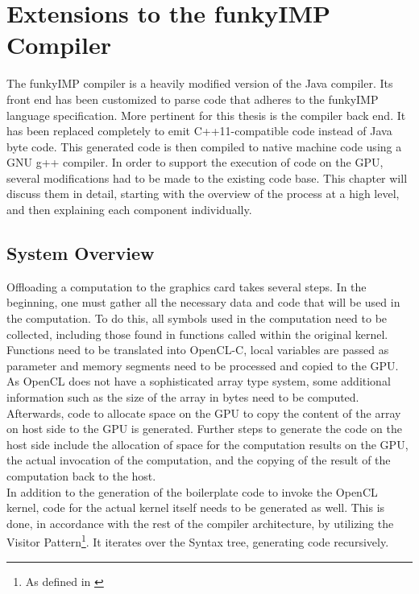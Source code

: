 
\chapter{Extensions to the funkyIMP Compiler}
\label{chap:compiler}
The funkyIMP compiler is a heavily modified version of the Java compiler. Its front end has been customized to parse code that adheres to the funkyIMP language specification. More pertinent for this thesis is the compiler back end. It has been replaced completely to emit C++11-compatible code instead of Java byte code. This generated code is then compiled to native machine code using a GNU g++ compiler. In order to support the execution of code on the GPU, several modifications had to be made to the existing code base. This chapter will discuss them in detail, starting with the overview of the process at a high level, and then explaining each component individually.



\section{System Overview}
\label{sect:compiler_overview}
Offloading a computation to the graphics card takes several steps. In the beginning, one must gather all the necessary data and code that will be used in the computation. To do this, all symbols used in the computation need to be collected, including those found in functions called within the original kernel. Functions need to be translated into OpenCL-C, local variables are passed as parameter and memory segments need to be processed and copied to the GPU. As OpenCL does not have a sophisticated array type system, some additional information such as the size of the array in bytes need to be computed. Afterwards, code to allocate space on the GPU to copy the content of the array on host side to the GPU is generated. Further steps to generate the code on the host side include the allocation of space for the computation results on the GPU, the actual invocation of the computation, and the copying of the result of the computation back to the host. \\

In addition to the generation of the boilerplate code to invoke the OpenCL kernel, code for the actual kernel itself needs to be generated as well. This is done, in accordance with the rest of the compiler architecture, by utilizing the Visitor Pattern\footnote{As defined in \cite{gamma1994design}}. It iterates over the Syntax tree, generating code recursively. \\

